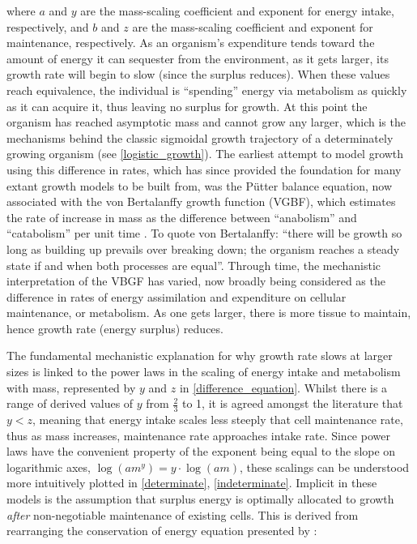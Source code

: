 \documentclass[a4paper]{article} %
\begin{document}
        where $a$ and $y$ are the mass-scaling coefficient and exponent for energy intake, respectively, and $b$ and $z$ are the mass-scaling coefficient and exponent for maintenance, respectively. As an organism's expenditure tends toward the amount of energy it can sequester from the environment, as it gets larger, its growth rate will begin to slow (since the surplus reduces). When these values reach equivalence, the individual is ``spending'' energy via metabolism as quickly as it can acquire it, thus leaving no surplus for growth. At this point the organism has reached asymptotic mass and cannot grow any larger, which is the mechanisms behind the classic sigmoidal growth trajectory of a determinately growing organism (see \ref{logistic_growth}).  The earliest attempt to model growth using this difference in rates, which has since provided the foundation for many extant growth models to be built from, was the P\"{u}tter balance equation, now associated with the von Bertalanffy growth function (VGBF), which estimates the rate of increase in mass as the difference between ``anabolism'' and ``catabolism'' per unit time \autocite{Putter1920, vonBert1938, VonBertalanffy1957}. To quote von Bertalanffy: ``there will be growth so long as building up prevails over breaking down; the organism reaches a steady state if and when both processes are equal''. Through time, the mechanistic interpretation of the VBGF has varied, now broadly being considered as the difference in rates of energy assimilation and expenditure on cellular maintenance, or metabolism. As one gets larger, there is more tissue to maintain, hence growth rate (energy surplus) reduces.
        
        The fundamental mechanistic explanation for why growth rate slows at larger sizes is linked to the power laws in the scaling of energy intake and metabolism with mass, represented by $y$ and $z$ in \eqref{difference_equation}. Whilst there is a range of derived values of $y$ from $\frac{2}{3}$ to 1, it is agreed amongst the literature that $y < z$, meaning that energy intake scales less steeply that cell maintenance rate, thus as mass increases, maintenance rate approaches intake rate. Since power laws have the convenient property of the exponent being equal to the slope on logarithmic axes, $\log{(am^y)} = y\cdot \log{(am)}$, these scalings can be understood more intuitively plotted in \ref{determinate}, \ref{indeterminate}.  Implicit in these models is the assumption that surplus energy is optimally allocated to growth \textit{after} non-negotiable maintenance of existing cells. This is derived from rearranging the conservation of energy equation presented by \cite{West2001}:
        
\end{document}

